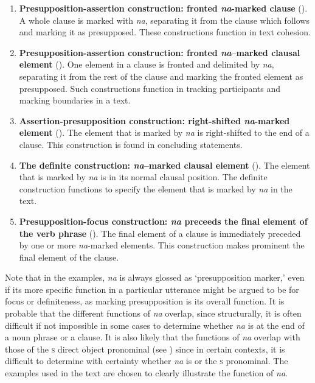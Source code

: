 \begin{enumerate}
\item \textbf{Presupposition-assertion construction: fronted \textit{na}{}-marked clause} (). A whole clause is marked with \textit{na}, separating it from the clause which follows and marking it as presupposed. These constructions function in text cohesion. 
\item \textbf{Presupposition-assertion construction: fronted \textit{na}–marked clausal element} (). One element in a clause is fronted and delimited by \textit{na}, separating it from the rest of the clause and marking the fronted element as presupposed. Such constructions function in tracking participants and marking boundaries in a text. 
\item \textbf{Assertion-presupposition construction: right-shifted \textit{na}{}-marked element} (). The element that is marked by \textit{na} is right-shifted to the end of a clause. This construction is found in concluding statements. 
\item \textbf{The definite construction: \textit{na}–marked clausal element} (). The element that is marked by \textit{na} is in its normal clausal position. The definite construction functions to specify the element that is marked by \textit{na} in the text. 
\item \textbf{Presupposition-focus construction: \textit{na} preceeds the final element of the verb phrase} (). The final element of a clause is immediately preceded by one or more \textit{na}{}-marked elements. This construction makes prominent the final element of the clause. 
\end{enumerate}

Note that in the examples, \textit{na} is always glossed as {\PSP} ‘presupposition marker,’ even if its more specific function in a particular utterance might be argued to be for focus or definiteness, as marking presupposition is its overall function. It is probable that the different functions of \textit{na} overlap, since structurally, it is often difficult if not impossible in some cases to determine whether \textit{na} is at the end of a noun phrase  or a clause. It is also likely that the functions of \textit{na} overlap with those of the \textsc{s} direct object pronominal (see ) since in certain contexts, it is difficult to determine with certainty whether \textit{na} is {\PSP} or the \textsc{s} \DO pronominal. The examples used in the text are chosen to clearly illustrate the function of \textit{na}.

